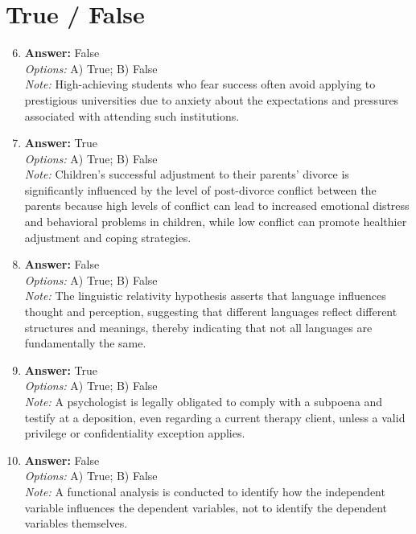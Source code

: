 \documentclass[12pt]{article}
\begin{document}
\section*{True / False}
\begin{enumerate}[label=\arabic*.]
\setcounter{enumi}{5}
\item \textbf{Answer:} False
\\ \textit{Options:} A) True; B) False
\\ \textit{Note:} High-achieving students who fear success often avoid applying to prestigious universities due to anxiety about the expectations and pressures associated with attending such institutions.
\item \textbf{Answer:} True
\\ \textit{Options:} A) True; B) False
\\ \textit{Note:} Children's successful adjustment to their parents' divorce is significantly influenced by the level of post-divorce conflict between the parents because high levels of conflict can lead to increased emotional distress and behavioral problems in children, while low conflict can promote healthier adjustment and coping strategies.
\item \textbf{Answer:} False
\\ \textit{Options:} A) True; B) False
\\ \textit{Note:} The linguistic relativity hypothesis asserts that language influences thought and perception, suggesting that different languages reflect different structures and meanings, thereby indicating that not all languages are fundamentally the same.
\item \textbf{Answer:} True
\\ \textit{Options:} A) True; B) False
\\ \textit{Note:} A psychologist is legally obligated to comply with a subpoena and testify at a deposition, even regarding a current therapy client, unless a valid privilege or confidentiality exception applies.
\item \textbf{Answer:} False
\\ \textit{Options:} A) True; B) False
\\ \textit{Note:} A functional analysis is conducted to identify how the independent variable influences the dependent variables, not to identify the dependent variables themselves.
\end{enumerate}
\end{document}
